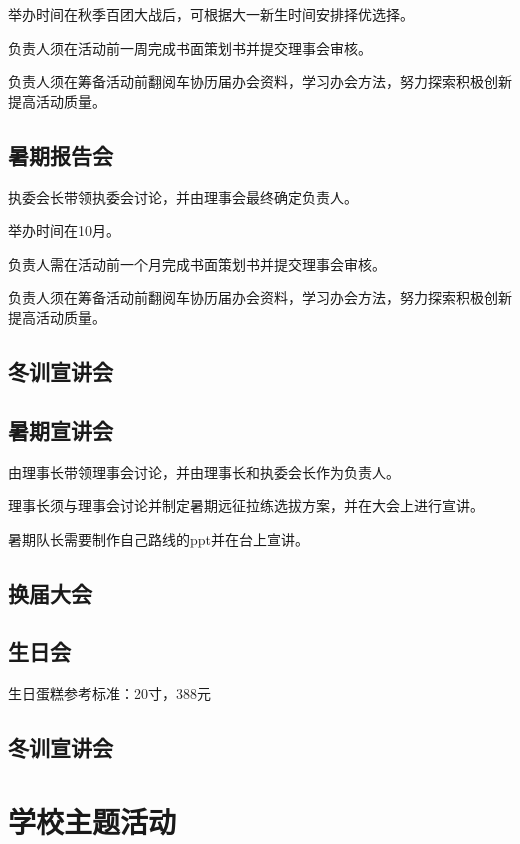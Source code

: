 \documentclass{ctexbook}
\begin{document}
举办时间在秋季百团大战后，可根据大一新生时间安排择优选择。

负责人须在活动前一周完成书面策划书并提交理事会审核。

负责人须在筹备活动前翻阅车协历届办会资料，学习办会方法，努力探索积极创新提高活动质量。
\subsection{暑期报告会}

执委会长带领执委会讨论，并由理事会最终确定负责人。

    举办时间在10月。

    负责人需在活动前一个月完成书面策划书并提交理事会审核。

    负责人须在筹备活动前翻阅车协历届办会资料，学习办会方法，努力探索积极创新提高活动质量。

\subsection{冬训宣讲会}


\subsection{暑期宣讲会}
   由理事长带领理事会讨论，并由理事长和执委会长作为负责人。

   理事长须与理事会讨论并制定暑期远征拉练选拔方案，并在大会上进行宣讲。

   暑期队长需要制作自己路线的ppt并在台上宣讲。
\subsection{换届大会}

\subsection{生日会}
    生日蛋糕参考标准：20寸，388元

\subsection{冬训宣讲会}


\section{学校主题活动}
\end{document}
